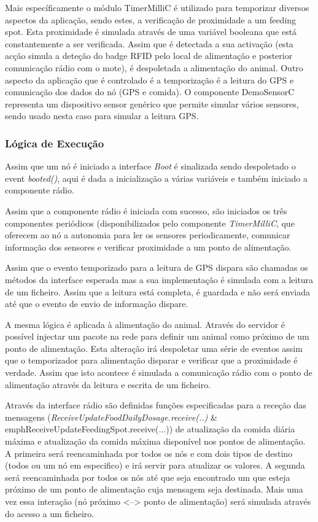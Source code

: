 \documentclass[times,10pt,twocolumn]{article}
\begin{document}
Mais específicamente o módulo TimerMilliC é utilizado para temporizar diversos aspectos da aplicação, sendo estes, a verificação de proximidade a um feeding spot. Esta proximidade é simulada através de uma variável booleana que está constantemente a ser verificada. Assim que é detectada a sua activação (esta acção simula a deteção do badge RFID pelo local de alimentação e posterior comunicação rádio com o mote), é despoletada a alimentação do animal. Outro aspecto da aplicação que é controlado é a temporização é a leitura do GPS e comunicação dos dados do nó (GPS e comida). O componente DemoSensorC representa um dispositivo sensor genérico que permite simular vários sensores, sendo usado nesta caso para simular a leitura GPS.


\subsubsection{Lógica de Execução}

Assim que um nó é iniciado a interface \emph{Boot } é sinalizada sendo despoletado o event \emph{booted()}, aqui é dada a inicialização a várias variáveis e também iniciado a componente rádio.

Assim que a componente rádio é iniciada com sucesso, são iniciados os três componentes periódicos (disponibilizados pelo componente \emph{TimerMilliC}, que oferecem ao nó a autonomia para ler os sensores periodicamente, comunicar informação dos sensores e verificar proximidade a um ponto de alimentação.

Assim que o evento temporizado para a leitura de GPS dispara são chamadas os métodos da interface esperada mas a sua implementação é simulada com a leitura de um ficheiro. Assim que a leitura está completa, é guardada e não será enviada até que o evento de envio de informação dispare. 

A mesma lógica é aplicada à alimentação do animal. Através do servidor é possível injectar um pacote na rede para definir um animal como próximo de um ponto de alimentação. Esta alteração irá despoletar uma série de eventos assim que o temporizador para alimentação disparar e verificar que a proximidade é verdade. Assim que isto acontece é simulada a comunicação rádio com o ponto de alimentação através da leitura e escrita de um ficheiro.

Através da interface rádio são definidas funções especificadas para a receção das mensagens (\emph{ReceiveUpdateFoodDailyDosage.receive(..)} \& emph{ReceiveUpdateFeedingSpot.receive(...)}) de atualização da comida diária máxima e atualização da comida máxima disponível nos pontos de alimentação. A primeira será reencaminhada por todos os nós e com dois tipos de destino (todos ou um nó em especifico) e irá servir para atualizar os valores. A segunda será reencaminhada por todos os nós até que seja encontrado um que esteja próximo de um ponto de alimentação cuja mensagem seja destinada. Mais uma vez essa interação (nó próximo <--> ponto de alimentação) será simulada através do acesso a um ficheiro.
\end{document}
